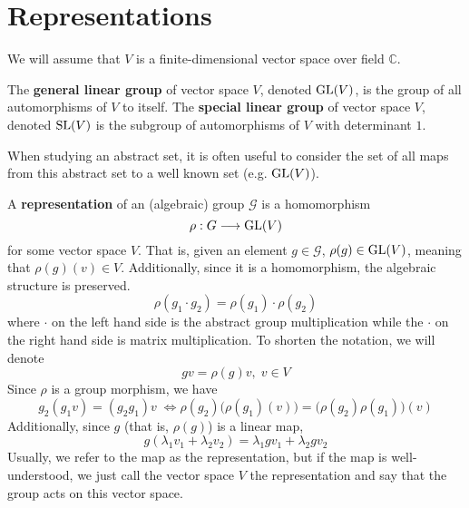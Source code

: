 \section{Representations}

  We will assume that $V$ is a finite-dimensional vector space over field $\mathbb{C}$. 

  \begin{definition}
    The \textbf{general linear group} of vector space $V$, denoted $\operatorname{GL}(V)$, is the group of all automorphisms of $V$ to itself. The \textbf{special linear group} of vector space $V$, denoted $\operatorname{SL}(V)$ is the subgroup of automorphisms of $V$ with determinant $1$. 
  \end{definition}

  When studying an abstract set, it is often useful to consider the set of all maps from this abstract set to a well known set (e.g. $\operatorname{GL}(V)$). 

  \begin{definition}
    A \textbf{representation} of an (algebraic) group $\mathcal{G}$ is a homomorphism 
    \begin{equation}
      \rho: G \longrightarrow \operatorname{GL}(V)
    \end{equation}
    for some vector space $V$. That is, given an element $g \in \mathcal{G}$, $\rho(g) \in \operatorname{GL} (V)$, meaning that $\rho(g)(v) \in V$. Additionally, since it is a homomorphism, the algebraic structure is preserved. 
    \begin{equation}
      \rho(g_1 \cdot g_2) = \rho(g_1) \cdot \rho(g_2)
    \end{equation}
    where $\cdot$ on the left hand side is the abstract group multiplication while the $\cdot$ on the right hand side is matrix multiplication. To shorten the notation, we will denote 
    \begin{equation}
      g v = \rho(g) v, \; v \in V
    \end{equation}
    Since $\rho$ is a group morphism, we have 
    \begin{equation}
      g_2 (g_1 v) = (g_2 g_1) v \; \iff \rho(g_2) \big( \rho(g_1) (v) \big) = \big( \rho(g_2) \rho(g_1) \big) (v)
    \end{equation}
    Additionally, since $g$ (that is, $\rho(g)$) is a linear map, 
    \begin{equation}
      g(\lambda_1 v_1 + \lambda_2 v_2) = \lambda_1 g v_1 + \lambda_2 g v_2
    \end{equation}
    Usually, we refer to the map as the representation, but if the map is well-understood, we just call the vector space $V$ the representation and say that the group acts on this vector space. 
  \end{definition}

